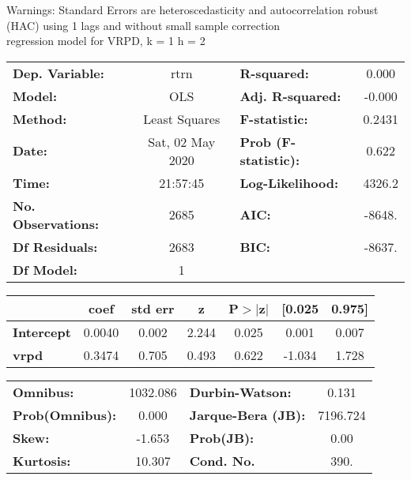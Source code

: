 Warnings: \newline
 [1] Standard Errors are heteroscedasticity and autocorrelation robust (HAC) using 1 lags and without small sample correction\\ 

regression model for VRPD, k = 1 h = 2\begin{center}
\begin{tabular}{lclc}
\toprule
\textbf{Dep. Variable:}    &       rtrn       & \textbf{  R-squared:         } &     0.000   \\
\textbf{Model:}            &       OLS        & \textbf{  Adj. R-squared:    } &    -0.000   \\
\textbf{Method:}           &  Least Squares   & \textbf{  F-statistic:       } &    0.2431   \\
\textbf{Date:}             & Sat, 02 May 2020 & \textbf{  Prob (F-statistic):} &    0.622    \\
\textbf{Time:}             &     21:57:45     & \textbf{  Log-Likelihood:    } &    4326.2   \\
\textbf{No. Observations:} &        2685      & \textbf{  AIC:               } &    -8648.   \\
\textbf{Df Residuals:}     &        2683      & \textbf{  BIC:               } &    -8637.   \\
\textbf{Df Model:}         &           1      & \textbf{                     } &             \\
\bottomrule
\end{tabular}
\begin{tabular}{lcccccc}
                   & \textbf{coef} & \textbf{std err} & \textbf{z} & \textbf{P$> |$z$|$} & \textbf{[0.025} & \textbf{0.975]}  \\
\midrule
\textbf{Intercept} &       0.0040  &        0.002     &     2.244  &         0.025        &        0.001    &        0.007     \\
\textbf{vrpd}      &       0.3474  &        0.705     &     0.493  &         0.622        &       -1.034    &        1.728     \\
\bottomrule
\end{tabular}
\begin{tabular}{lclc}
\textbf{Omnibus:}       & 1032.086 & \textbf{  Durbin-Watson:     } &    0.131  \\
\textbf{Prob(Omnibus):} &   0.000  & \textbf{  Jarque-Bera (JB):  } & 7196.724  \\
\textbf{Skew:}          &  -1.653  & \textbf{  Prob(JB):          } &     0.00  \\
\textbf{Kurtosis:}      &  10.307  & \textbf{  Cond. No.          } &     390.  \\
\bottomrule
\end{tabular}
\end{center}

